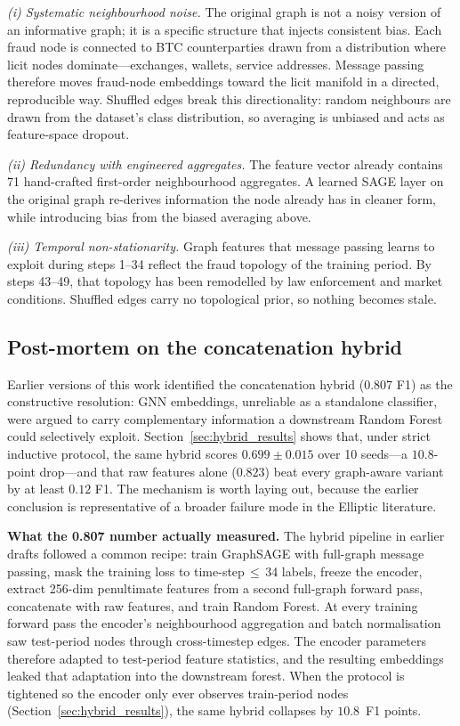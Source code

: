 \textit{(i) Systematic neighbourhood noise.}  The original graph is
not a noisy version of an informative graph; it is a specific structure
that injects consistent bias.  Each fraud node is connected to BTC
counterparties drawn from a distribution where licit nodes
dominate---exchanges, wallets, service addresses.  Message passing
therefore moves fraud-node embeddings toward the licit manifold in a
directed, reproducible way.  Shuffled edges break this directionality:
random neighbours are drawn from the dataset's class distribution, so
averaging is unbiased and acts as feature-space dropout.

\textit{(ii) Redundancy with engineered aggregates.}  The feature
vector already contains 71 hand-crafted first-order neighbourhood
aggregates.  A learned SAGE layer on the original graph re-derives
information the node already has in cleaner form, while introducing
bias from the biased averaging above.

\textit{(iii) Temporal non-stationarity.}  Graph features that message
passing learns to exploit during steps 1--34 reflect the fraud topology
of the training period.  By steps 43--49, that topology has been
remodelled by law enforcement and market conditions.  Shuffled edges
carry no topological prior, so nothing becomes stale.

\subsection{Post-mortem on the concatenation hybrid}
\label{sec:why_hybrid}

Earlier versions of this work identified the concatenation hybrid
(0.807 F1) as the constructive resolution: GNN embeddings, unreliable
as a standalone classifier, were argued to carry complementary
information a downstream Random Forest could selectively exploit.
Section~\ref{sec:hybrid_results} shows that, under strict inductive
protocol, the same hybrid scores $0.699 \pm 0.015$ over 10 seeds---a
$10.8$-point drop---and that raw features alone ($0.823$) beat every
graph-aware variant by at least $0.12$ F1.  The mechanism is worth
laying out, because the earlier conclusion is representative of a
broader failure mode in the Elliptic literature.

\textbf{What the 0.807 number actually measured.}  The hybrid
pipeline in earlier drafts followed a common recipe: train GraphSAGE
with full-graph message passing, mask the training loss to
time-step\,$\le$\,34 labels, freeze the encoder, extract 256-dim
penultimate features from a second full-graph forward pass,
concatenate with raw features, and train Random Forest.  At every
training forward pass the encoder's neighbourhood aggregation and
batch normalisation saw test-period nodes through cross-timestep
edges.  The encoder parameters therefore adapted to test-period
feature statistics, and the resulting embeddings leaked that
adaptation into the downstream forest.  When the protocol is
tightened so the encoder only ever observes train-period nodes
(Section~\ref{sec:hybrid_results}), the same hybrid collapses by
$10.8$~F1 points.

